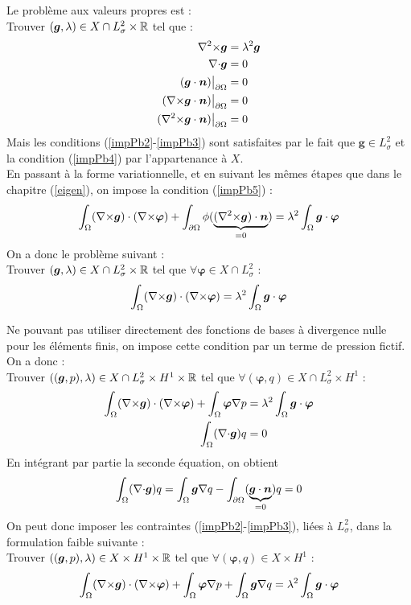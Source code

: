 Le problème aux valeurs propres est :\\
Trouver $(\bm{g},\lambda)\in X\cap L^2_\sigma\times{\mathbb{R}}$ tel que :
\begin{align}
{\nabla^2\times}\bm{g}&=\lambda^2\bm{g} \label{impPb1}\\
{\nabla\cdot}\bm{g}&=0 \label{impPb2}\\
(\bm{g}\cdot\bm{n}){\big\rvert_{\partial\Omega}}&=0 \label{impPb3}\\
({\nabla\times}\bm{g}\cdot\bm{n}){\big\rvert_{\partial\Omega}}&=0 \label{impPb4}\\
({\nabla^2\times}\bm{g}\cdot\bm{n}){\big\rvert_{\partial\Omega}}&=0 \label{impPb5}
\end{align}
Mais les conditions (\ref{impPb2}-\ref{impPb3}) sont satisfaites par le fait que $\bm{g}\in L^2_\sigma$ et la condition (\ref{impPb4}) par l'appartenance à $X$.\\

En passant à la forme variationnelle, et en suivant les mêmes étapes que dans le chapitre (\ref{eigen}), on impose la condition (\ref{impPb5}) :
\[ \int_\Omega ({\nabla\times}\bm{g})\cdot({\nabla\times}\bm{\varphi}) + \int_{\partial\Omega} \phi(\underbrace{({\nabla^2\times} \bm{g})\cdot\bm{n}}_{=0})= \lambda^2\int_\Omega \bm{g}\cdot\bm{\varphi} \]
On a donc le problème suivant :\\
Trouver $(\bm{g},\lambda)\in X\cap L^2_\sigma\times{\mathbb{R}}$ tel que $\forall \bm{\varphi}\in X\cap L^2_\sigma$ :
\[ \int_\Omega ({\nabla\times}\bm{g})\cdot({\nabla\times}\bm{\varphi}) = \lambda^2\int_\Omega \bm{g}\cdot\bm{\varphi} \]

Ne pouvant pas utiliser directement des fonctions de bases à divergence nulle pour les éléments finis, on impose cette condition par un terme de pression fictif. On a donc :\\
Trouver $((\bm{g},p),\lambda)\in X\cap L^2_\sigma \times H^1 \times {\mathbb{R}}$ tel que $\forall (\bm{\varphi},q)\in X\cap L^2_\sigma \times H^1$ :
\begin{align*}
\int_\Omega ({\nabla\times}\bm{g})\cdot({\nabla\times}\bm{\varphi}) + \int_\Omega\bm{\varphi}{\nabla} p &= \lambda^2\int_\Omega \bm{g}\cdot\bm{\varphi}\\
\int_\Omega ({\nabla\cdot}\bm{g}) q &= 0
\end{align*}
En intégrant par partie la seconde équation, on obtient
\[ \int_\Omega ({\nabla\cdot}\bm{g}) q = \int_\Omega \bm{g}{\nabla} q - \int_{\partial\Omega} (\underbrace{\bm{g}\cdot \bm{n}}_{=0})q = 0 \]
On peut donc imposer les contraintes (\ref{impPb2}-\ref{impPb3}), liées à $L^2_\sigma$, dans la formulation faible suivante :\\
Trouver $((\bm{g},p),\lambda)\in X \times H^1 \times {\mathbb{R}}$ tel que $\forall (\bm{\varphi},q)\in X \times H^1$ :
\[ \int_\Omega ({\nabla\times}\bm{g})\cdot({\nabla\times}\bm{\varphi}) + \int_\Omega\bm{\varphi}{\nabla} p + \int_\Omega \bm{g}{\nabla} q = \lambda^2\int_\Omega \bm{g}\cdot\bm{\varphi} \]

